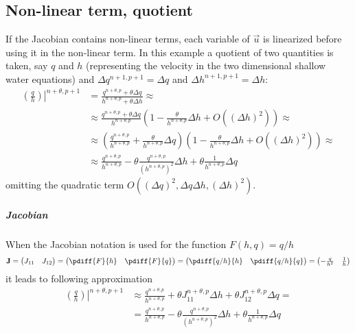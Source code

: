 \subsection{Non-linear term, quotient}\label{sec:jacobians_with_non_linear_quotient_term}
If the Jacobian contains non-linear terms, each variable of $\vec{u}$ is linearized before using it in the non-linear term.
In this example a quotient of two quantities is taken, say $q$ and $h$ (representing the velocity in the two dimensional shallow water equations) and  $\Delta q^{n+1, p+1} = \Delta q$ and  $\Delta h^{n+1, p+1} = \Delta h$:
\begin{align}
    \left.\left(\frac{q}{h}\right)\right|^{n+\theta, p+1} & = \frac{ q^{n+\theta, p} + \theta  \Delta q }{ h^{n+\theta, p} + \theta  \Delta h} \approx
    \\
    & \approx \frac{ q^{n+\theta, p} + \theta  \Delta q }{ h^{n+\theta, p}} \left( 1 - \frac{\theta}{h^{n+\theta, p}} \Delta h  + O\left(  (\Delta h)^2 \right) \right)  \approx
    \\
    & \approx \left( \frac{ q^{n+\theta, p}}{ h^{n+\theta, p}} + \frac{\theta}{ h^{n+\theta, p}}  \Delta q \right)
    \left( 1 - \frac{\theta}{h^{n+\theta, p}} \Delta h  + O\left(  (\Delta h)^2 \right) \right)  \approx
    \\
    & \approx  \frac{ q^{n+\theta, p}}{ h^{n+\theta, p}}  - \theta \frac{ q^{n+\theta, p}}{ (h^{n+\theta, p})^2} \Delta h + \theta\frac{1}{ h^{n+\theta, p}}  \Delta q
\end{align}
omitting the quadratic term $O((\Delta q)^2, \Delta q \Delta h, (\Delta h)^2)$.
\subparagraph*{Jacobian}
When the Jacobian notation is  used for the function $F(h,q) = q/h$
\begin{align}
    \mat{J} =
    \begin{pmatrix}
        J_{11} & J_{12}
    \end{pmatrix}
    =
    \begin{pmatrix}
        \pdiff{F}{h} & \pdiff{F}{q}
    \end{pmatrix}
    =
    \begin{pmatrix}
        \pdiff{q/h}{h} & \pdiff{q/h}{q}
    \end{pmatrix}
    =
    \begin{pmatrix}
        -\frac{q}{h^2} & \frac{1}{h}
    \end{pmatrix}
\end{align}
it leads to following approximation
\begin{align}
    \left.\left(\frac{q}{h}\right)\right|^{n+\theta, p+1} &  \approx  \frac{q^{n+\theta, p}}{h^{n+\theta, p}} + \theta J_{11}^{n+\theta, p} \Delta h + \theta J_{12}^{n+\theta, p} \Delta q =
    \\
    & = \frac{q^{n+\theta, p}}{h^{n+\theta, p}} - \theta \frac{q^{n+\theta, p}}{(h^{n+\theta, p})^2} \Delta h + \theta \frac{1}{h^{n+\theta, p}} \Delta q
\end{align}
